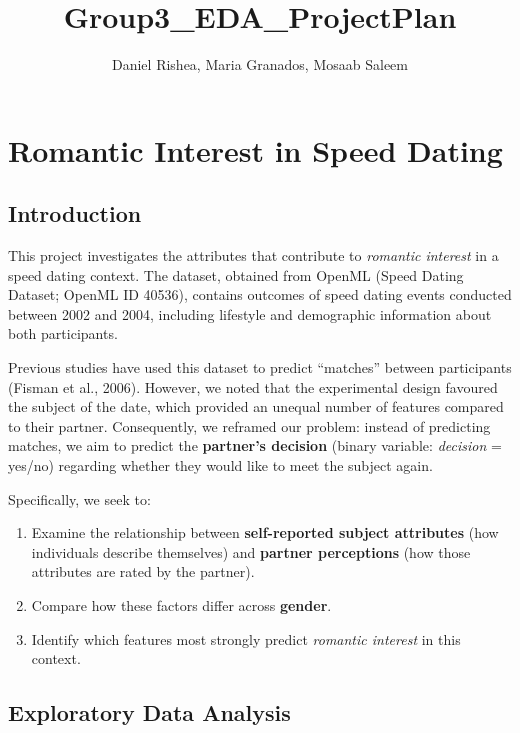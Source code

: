 \documentclass[
  letterpaper,
  DIV=11,
  numbers=noendperiod]{scrartcl}
\title{Group3\_EDA\_ProjectPlan}
\author{Daniel Rishea, Maria Granados, Mosaab Saleem}
\date{}
\providecommand{\tightlist}{%
  \setlength{\itemsep}{0pt}\setlength{\parskip}{0pt}}\usepackage{longtable,booktabs,array}
\begin{document}
\maketitle


\section{Romantic Interest in Speed
Dating}\label{romantic-interest-in-speed-dating}

\subsection{Introduction}\label{introduction}

This project investigates the attributes that contribute to
\emph{romantic interest} in a speed dating context. The dataset,
obtained from OpenML (Speed Dating Dataset; OpenML ID 40536), contains
outcomes of speed dating events conducted between 2002 and 2004,
including lifestyle and demographic information about both participants.

Previous studies have used this dataset to predict ``matches'' between
participants (Fisman et al., 2006). However, we noted that the
experimental design favoured the subject of the date, which provided an
unequal number of features compared to their partner. Consequently, we
reframed our problem: instead of predicting matches, we aim to predict
the \textbf{partner's decision} (binary variable: \emph{decision} =
yes/no) regarding whether they would like to meet the subject again.

Specifically, we seek to:

\begin{enumerate}
\def\labelenumi{\arabic{enumi}.}
\tightlist
\item
  Examine the relationship between \textbf{self-reported subject
  attributes} (how individuals describe themselves) and \textbf{partner
  perceptions} (how those attributes are rated by the partner).
\item
  Compare how these factors differ across \textbf{gender}.
\item
  Identify which features most strongly predict \emph{romantic interest}
  in this context.
\end{enumerate}

\subsection{Exploratory Data Analysis}\label{exploratory-data-analysis}
\end{document}
